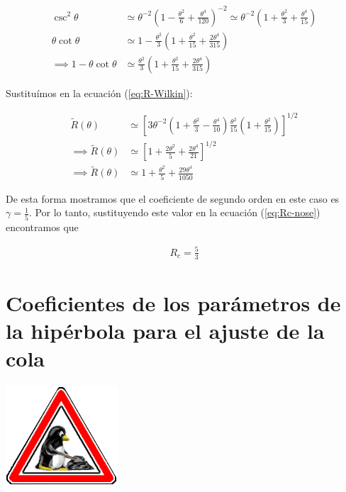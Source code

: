 \begin{align}
  \csc^2\theta &\simeq \theta^{-2}\left(1 - \frac{\theta^2}{6} + \frac{\theta^4}{120}\right)^{-2} \simeq
                 \theta^{-2}\left(1 + \frac{\theta^2}{3} + \frac{\theta^4}{15}\right) \\
  \theta\cot\theta &\simeq 1 - \frac{\theta^2}{3}\left(1 + \frac{\theta^2}{15} + \frac{2\theta^4}{315}\right) \\
  \implies 1 -\theta\cot\theta &\simeq \frac{\theta^2}{3}\left(1 + \frac{\theta^2}{15} + \frac{2\theta^4}{315}\right)
\end{align}

Sustituímos en la ecuación (\ref{eq:R-Wilkin}):

\begin{align}
  \tilde{R}(\theta) &\simeq \left[3\theta^{-2}\left(1 + \frac{\theta^2}{3}-\frac{\theta^4}{10}\right)\frac{\theta^2}{15}
  \left(1 + \frac{\theta^2}{15}\right) \right]^{1/2} \\
  \implies \tilde{R}(\theta) &\simeq \left[1 + \frac{2\theta^2}{5} + \frac{2\theta^4}{21}\right]^{1/2} \\
  \implies \tilde{R}(\theta) &\simeq 1 + \frac{\theta^2}{5} + \frac{29\theta^4}{1050}
\end{align}

De esta forma mostramos que el coeficiente de segundo orden en este caso es $\gamma = \frac{1}{5}$. Por lo tanto,
sustituyendo este valor en la ecuación (\ref{eq:Rc-nose}) encontramos que

\begin{align}
  R_c = \frac{5}{3}
\end{align}

\chapter{Coeficientes de los parámetros de la hipérbola para el ajuste de la cola}
\includegraphics[width=0.5\linewidth]{./Figures/tux-development}
